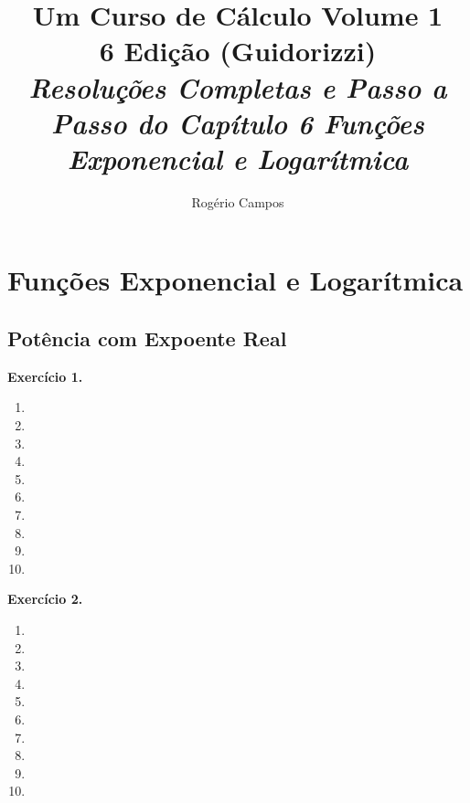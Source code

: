 \documentclass[12pt,a4paper]{article}
\title{
    \Huge \textbf{Um Curso de Cálculo Volume 1} \\
    \vspace{0.3cm}
    \Large 6\textordfeminine{} Edição (Guidorizzi) \\
    \vspace{0.5cm}
    \large \textit{Resoluções Completas e Passo a Passo do Capítulo 6 Funções Exponencial e Logarítmica}
}
\author{Rogério Campos}
\begin{document}
\maketitle
\newpage

\tableofcontents
\newpage

\setcounter{section}{5}
\setcounter{subsection}{0}

\section{Funções Exponencial e Logarítmica}

\subsection{Potência com Expoente Real}
\vspace{0.5cm}
\noindent\textbf{Exercício 1.}
\begin{enumerate}
    \renewcommand{\theenumi}{\alph{enumi}}
    \renewcommand{\labelenumi}{\theenumi)}
    \item 
    \item 
    \item 
    \item 
    \item 
    \item 
    \item 
    \item 
    \item 
    \item 
\end{enumerate}

\vspace{0.5cm}
\noindent\textbf{Exercício 2.}
\begin{enumerate}
    \renewcommand{\theenumi}{\alph{enumi}}
    \renewcommand{\labelenumi}{\theenumi)}
    \item 
    \item 
    \item 
    \item 
    \item 
    \item 
    \item 
    \item 
    \item 
    \item 
\end{enumerate}
\end{document}
